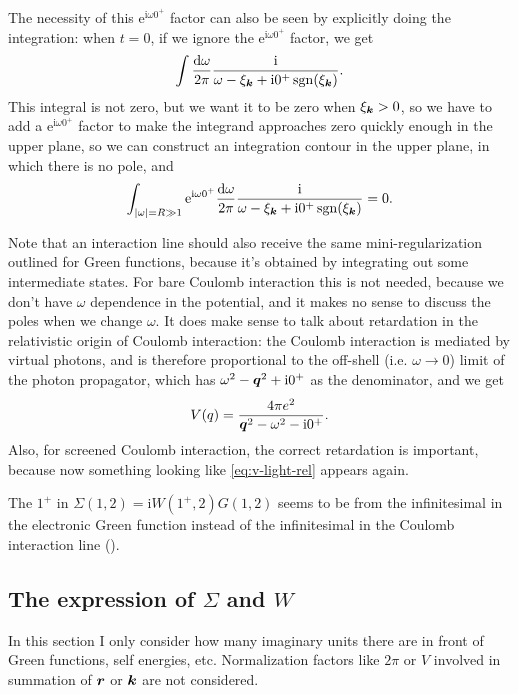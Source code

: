 \documentclass[hyperref, a4paper]{report}
\DeclareMathOperator{\sgn}{sgn}
\newcommand*{\ii}{\mathrm{i}}
\newcommand*{\ee}{\mathrm{e}}
\begin{document}
The necessity of this $\ee^{\ii \omega 0^+}$ factor 
can also be seen by explicitly doing the integration:
when $t = 0$, if we ignore the $\ee^{\ii \omega 0^+}$ factor, 
we get 
\[
    \int \frac{\dd{\omega}}{2\pi} \frac{\ii}{ \omega - \xi_{\vb*{k}} + \ii 0^+ \sgn(\xi_{\vb*{k}})}.
\]
This integral is not zero, but we want it to be zero when $\xi_{\vb*{k}} > 0$,
so we have to add a $\ee^{\ii \omega 0^+}$ factor
to make the integrand approaches zero quickly enough in the upper plane,
so we can construct an integration contour in the upper plane,
in which there is no pole, 
and 
\[
    \int_{\abs{\omega} = R \gg 1} \ee^{\ii \omega 0^+} \frac{\dd{\omega}}{2\pi} 
    \frac{\ii}{ \omega - \xi_{\vb*{k}} + \ii 0^+ \sgn(\xi_{\vb*{k}})} = 0.
\]

Note that an interaction line should also receive the same mini-regularization 
outlined for Green functions, 
because it's obtained by integrating out some intermediate states. 
For bare Coulomb interaction this is not needed,
because we don't have $\omega$ dependence in the potential,
and it makes no sense to discuss the poles when we change $\omega$.
It does make sense to talk about retardation 
in the relativistic origin of Coulomb interaction:
the Coulomb interaction is mediated by virtual photons,
and is therefore proportional to the off-shell (i.e. $\omega \to 0$) limit of 
the photon propagator, 
which has $\omega^2 - \vb*{q}^2 + \ii 0^+$ 
as the denominator, and we get 
\begin{equation}
    V(q) = \frac{4\pi e^2}{\vb*{q}^2 - \omega^2 - \ii 0^+}.
    \label{eq:v-light-rel}
\end{equation}
Also, for screened Coulomb interaction, 
the correct retardation is important,
because now something looking like \eqref{eq:v-light-rel} appears again.

The $1^+$ in $\Sigma(1, 2) = \ii W(1^+, 2) G(1, 2)$ 
seems to be from the infinitesimal in the electronic Green function 
instead of the infinitesimal in the Coulomb interaction line
().

\subsection{The expression of $\Sigma$ and $W$}\label{sec:gw-bse.preliminaries.diagram.corrections}

In this section I only consider how many imaginary units there are in front of 
Green functions, self energies, etc.
Normalization factors like $2\pi$ or $V$ 
involved in summation of $\vb*{r}$ or $\vb*{k}$ are not considered.
\end{document}
